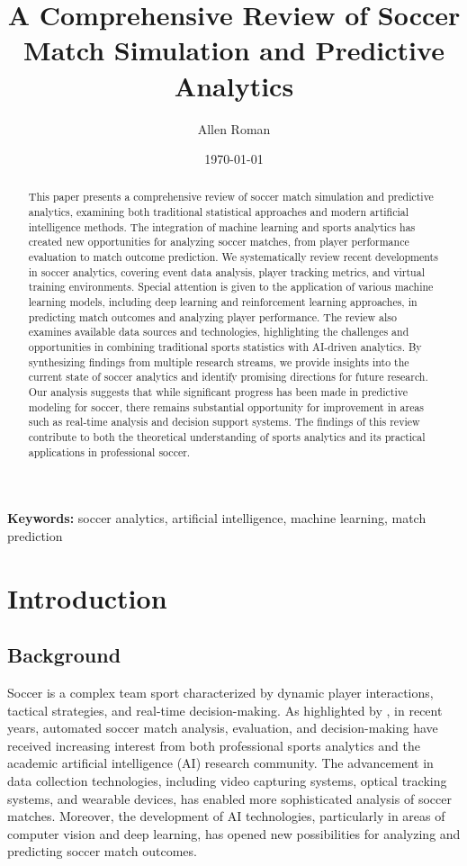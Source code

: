 \documentclass[10pt,journal,compsoc]{IEEEtran}
\title{A Comprehensive Review of Soccer Match Simulation and Predictive Analytics}
\author{Allen Roman}
\date{\today}
\begin{document}
\maketitle

\begin{abstract}
This paper presents a comprehensive review of soccer match simulation and predictive analytics, examining both traditional statistical approaches and modern artificial intelligence methods. The integration of machine learning and sports analytics has created new opportunities for analyzing soccer matches, from player performance evaluation to match outcome prediction. We systematically review recent developments in soccer analytics, covering event data analysis, player tracking metrics, and virtual training environments. Special attention is given to the application of various machine learning models, including deep learning and reinforcement learning approaches, in predicting match outcomes and analyzing player performance. The review also examines available data sources and technologies, highlighting the challenges and opportunities in combining traditional sports statistics with AI-driven analytics. By synthesizing findings from multiple research streams, we provide insights into the current state of soccer analytics and identify promising directions for future research. Our analysis suggests that while significant progress has been made in predictive modeling for soccer, there remains substantial opportunity for improvement in areas such as real-time analysis and decision support systems. The findings of this review contribute to both the theoretical understanding of sports analytics and its practical applications in professional soccer.
\end{abstract}

\noindent\textbf{Keywords:} soccer analytics, artificial intelligence, machine learning, match prediction

\section{Introduction}

\subsection{Background}
Soccer is a complex team sport characterized by dynamic player interactions, tactical strategies, and real-time decision-making. As highlighted by \cite{pu2024orientation}, in recent years, automated soccer match analysis, evaluation, and decision-making have received increasing interest from both professional sports analytics and the academic artificial intelligence (AI) research community. The advancement in data collection technologies, including video capturing systems, optical tracking systems, and wearable devices, has enabled more sophisticated analysis of soccer matches. Moreover, the development of AI technologies, particularly in areas of computer vision and deep learning, has opened new possibilities for analyzing and predicting soccer match outcomes.
\end{document}
